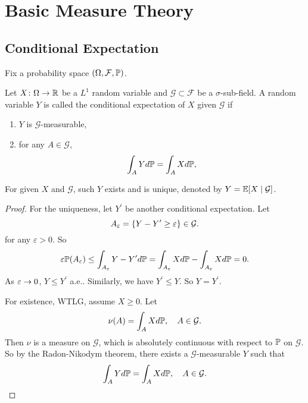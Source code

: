 \chapter{Basic Measure Theory}

\section{Conditional Expectation}
Fix a probability space $(\Omega, \mathcal{F},\mathbb{P})$.

\begin{defn}
    Let $X \colon \Omega \rightarrow \mathbb{R}$ be a $L^1$ random variable and $\mathcal{G} \subset \mathcal{F}$ be a $\sigma$-sub-field. A random variable $Y$ is called the conditional expectation of $X$ given $\mathcal{G}$ if
    \begin{enumerate}[label=(\roman*)]
    	\item $Y$ is $\mathcal{G}$-measurable,
    	\item for any $A \in \mathcal{G}$,
    	\begin{equation*}
    		\int_A Y d\mathbb{P} = \int_A X d\mathbb{P},
    	\end{equation*}
    \end{enumerate}
\end{defn}

\begin{thm}
    For given $X$ and $\mathcal{G}$, such $Y$ exists and is unique, denoted by $Y = \mathbb{E}[X \mid \mathcal{G}]$.
\end{thm}
\begin{proof}
    For the uniqueness, let $Y^\prime$ be another conditional expectation. Let
    \begin{equation*}
    	A_{\varepsilon} = \left\{Y - Y^\prime \geq \varepsilon\right\} \in \mathcal{G}.
    \end{equation*}
    for any $\varepsilon > 0$. So
    \begin{equation*}
    	\varepsilon \mathbb{P}({A_\varepsilon}) \leq \int_{A_\varepsilon} Y-Y^\prime d\mathbb{P} = \int_{A_\varepsilon} X d\mathbb{P}-\int_{A_\varepsilon} X d\mathbb{P} = 0.
    \end{equation*}
    As $\varepsilon \rightarrow 0$, $Y \leq Y^\prime$ a.e.. Similarly, we have $Y^\prime \leq Y$. So $Y =Y^\prime$.

    For existence, WTLG, assume $X \geq 0$. Let
    \begin{equation*}
    	\nu(A) = \int_A X d\mathbb{P},\quad A \in \mathcal{G}.
    \end{equation*}
    Then $\nu$ is a measure on $\mathcal{G}$, which is absolutely continuous with respect to $\mathbb{P}$ on $\mathcal{G}$. So by the Radon-Nikodym theorem, there exists a $\mathcal{G}$-measurable $Y$ such that
    \begin{equation*}
    	\int_A Y d\mathbb{P} = \int_A X d\mathbb{P},\quad A \in \mathcal{G}. \qedhere
    \end{equation*}
\end{proof}

